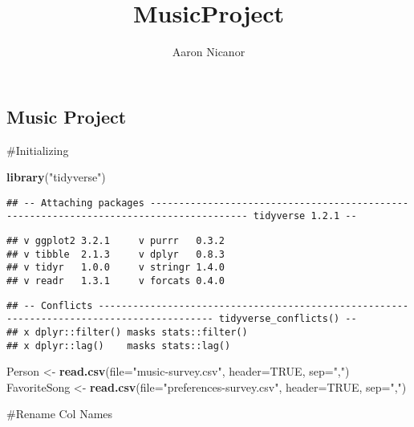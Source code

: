 \documentclass[]{article}
\title{MusicProject}
\author{Aaron Nicanor}
\date{}
\newenvironment{Shaded}{\begin{snugshade}}{\end{snugshade}}
\newcommand{\DataTypeTok}[1]{\textcolor[rgb]{0.13,0.29,0.53}{#1}}
\newcommand{\KeywordTok}[1]{\textcolor[rgb]{0.13,0.29,0.53}{\textbf{#1}}}
\newcommand{\NormalTok}[1]{#1}
\newcommand{\OtherTok}[1]{\textcolor[rgb]{0.56,0.35,0.01}{#1}}
\newcommand{\StringTok}[1]{\textcolor[rgb]{0.31,0.60,0.02}{#1}}
\begin{document}
\maketitle

\hypertarget{music-project}{%
\subsection{Music Project}\label{music-project}}

\#Initializing

\begin{Shaded}
\begin{Highlighting}[]
\KeywordTok{library}\NormalTok{(}\StringTok{"tidyverse"}\NormalTok{)}
\end{Highlighting}
\end{Shaded}

\begin{verbatim}
## -- Attaching packages --------------------------------------------------------------------------------------- tidyverse 1.2.1 --
\end{verbatim}

\begin{verbatim}
## v ggplot2 3.2.1     v purrr   0.3.2
## v tibble  2.1.3     v dplyr   0.8.3
## v tidyr   1.0.0     v stringr 1.4.0
## v readr   1.3.1     v forcats 0.4.0
\end{verbatim}

\begin{verbatim}
## -- Conflicts ------------------------------------------------------------------------------------------ tidyverse_conflicts() --
## x dplyr::filter() masks stats::filter()
## x dplyr::lag()    masks stats::lag()
\end{verbatim}

\begin{Shaded}
\begin{Highlighting}[]
\NormalTok{Person <-}\StringTok{ }\KeywordTok{read.csv}\NormalTok{(}\DataTypeTok{file=}\StringTok{"music-survey.csv"}\NormalTok{, }\DataTypeTok{header=}\OtherTok{TRUE}\NormalTok{, }\DataTypeTok{sep=}\StringTok{","}\NormalTok{)}
\NormalTok{FavoriteSong <-}\StringTok{ }\KeywordTok{read.csv}\NormalTok{(}\DataTypeTok{file=}\StringTok{"preferences-survey.csv"}\NormalTok{, }\DataTypeTok{header=}\OtherTok{TRUE}\NormalTok{, }\DataTypeTok{sep=}\StringTok{","}\NormalTok{)}
\end{Highlighting}
\end{Shaded}

\#Rename Col Names
\end{document}
